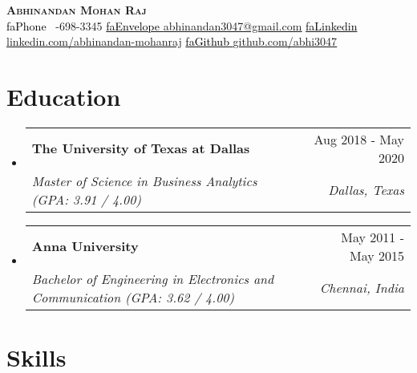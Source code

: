 \documentclass[letterpaper,12pt]{article}
\makeatletter
\newcommand{\resumeSubheading}[4]{
  \vspace{-2pt}\item
    \begin{tabular*}{0.97\textwidth}[t]{l@{\extracolsep{\fill}}r}
      \textbf{#1} & #2 \\
      \textit{\small#3} & \textit{\small #4} \\
    \end{tabular*}\vspace{-7pt}
}
\newcommand{\resumeSubSubheading}[2]{
    \item
    \begin{tabular*}{0.97\textwidth}{l@{\extracolsep{\fill}}r}
      \textit{\small#1} & \textit{\small #2} \\
    \end{tabular*}\vspace{-7pt}
}
\newcommand{\resumeSubHeadingListStart}{\begin{itemize}[leftmargin=0.15in, label={}]}
\newcommand{\resumeSubHeadingListEnd}{\end{itemize}}
\newcommand{\seticon}[1]{\textcolor{Black}{\csname #1\endcsname}}
\makeatother
\begin{document}
\begin{center}
    \textbf{\fontsize{11}{13.2}\selectfont \scshape Abhinandan Mohan Raj} \\ \vspace{1pt}
    \seticon{faPhone} \ \fontsize{11}{13.2}-698-3345 \quad
    \href{mailto:abhinandan3047@gmail.com}{\seticon{faEnvelope} \underline{\fontsize{11}{13.2}\selectfont abhinandan3047@gmail.com}} \quad
    \href{https://www.linkedin.com/in/abhinandan-mohanraj/}{\seticon{faLinkedin} \underline{\fontsize{11}{13.2}\selectfont linkedin.com/abhinandan-mohanraj}} \quad \quad \quad \quad \quad \quad \quad \quad \quad \quad \quad
    \href{https://github.com/abhi3047}{\seticon{faGithub} \underline{\fontsize{11}{13.2}\selectfont github.com/abhi3047}}
\end{center}

\section{Education}
    \resumeSubHeadingListStart

    \resumeSubheading
    {The University of Texas at Dallas}{Aug 2018 - May 2020}
    {Master of Science in Business Analytics (GPA: 3.91 / 4.00)}{Dallas, Texas}
    \resumeSubheading
    {Anna University}{May 2011 - May 2015}
    {Bachelor of Engineering in Electronics and Communication (GPA: 3.62 / 4.00)}{Chennai, India}
    \resumeSubHeadingListEnd

\section{Skills}
\resumeSubHeadingListStart
\resumeSubHeadingListEnd
\end{document}
